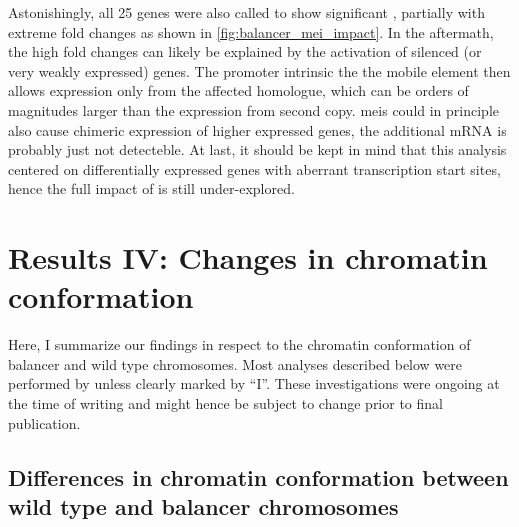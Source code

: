
Astonishingly, all 25 genes were also called to show significant \ase, partially
with extreme fold changes as shown in \cref{fig:balancer_mei_impact}.
In the aftermath, the high fold changes can likely be explained by the activation
of silenced (or very weakly expressed) genes. The promoter intrinsic the the mobile
element then allows expression only from the affected homologue, which can be
orders of magnitudes larger than the expression from second copy.
\Acp{mei} could in principle also cause chimeric
expression of higher expressed genes, the additional
mRNA is probably just not detecteble. At last, it should be kept in mind that
this analysis centered on differentially expressed genes with aberrant
transcription start sites, hence the full impact of \mei is still under-explored.









\section{Results IV: Changes in chromatin conformation}
\label{sec:balancer_cc}

Here, I summarize our findings in respect to the chromatin conformation of
balancer and wild type chromosomes. Most analyses described below were performed
by \alek unless clearly marked by ``I''. These investigations were ongoing at
the time of writing and might hence be subject to change prior to final
publication.

\subsection{Differences in chromatin conformation between wild type and balancer chromosomes}
\label{sec:balancer_cc_impl}

